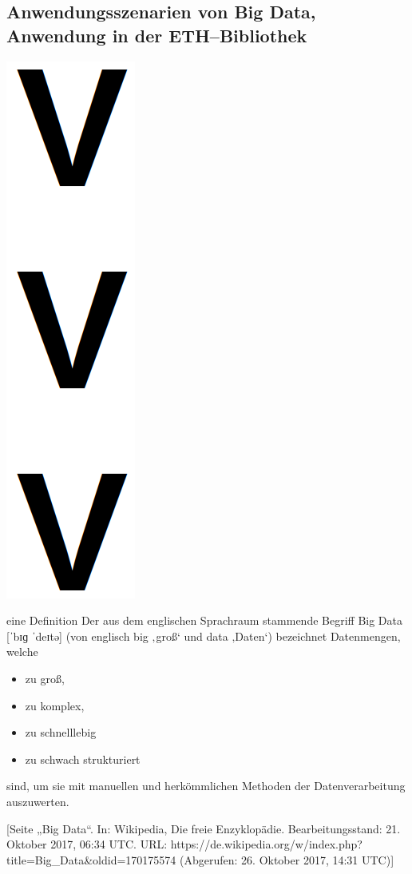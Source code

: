 \subsection{Anwendungsszenarien von Big Data, Anwendung in der ETH--Bibliothek}


\begin{frame}{}
  \begin{center}
    \includegraphics[height=0.8\textheight]{pics/vvv}
  \end{center}
\end{frame}

\begin{frame}{eine Definition}
  Der aus dem englischen Sprachraum stammende Begriff Big Data [ˈbɪɡ ˈdeɪtə] (von englisch big ‚groß‘ und data ‚Daten‘) bezeichnet Datenmengen, welche
  \begin{itemize}
    \item zu groß,
    \item zu komplex,
    \item zu schnelllebig
    \item zu schwach strukturiert
  \end{itemize}
  sind, um sie mit manuellen und herkömmlichen Methoden der Datenverarbeitung auszuwerten.
  \bigskip

  \footnotesize{[Seite „Big Data“. In: Wikipedia, Die freie Enzyklopädie. Bearbeitungsstand: 21. Oktober 2017, 06:34 UTC. URL: https://de.wikipedia.org/w/index.php?title=Big_Data&oldid=170175574 (Abgerufen: 26. Oktober 2017, 14:31 UTC)]}
\end{frame}

